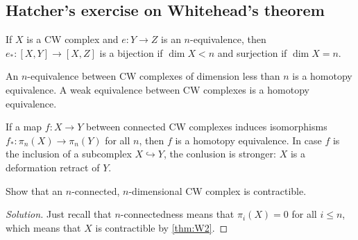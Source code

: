 \documentclass{article}
\numberwithin{equation}{section}
\begin{document}
\subsection{Hatcher's exercise on Whitehead's theorem}
\begin{thm}
	If $X$ is a CW complex and $e:Y\to Z$ is an $n$-equivalence, then $e_*:[X,Y]\to[X,Z]$ is a bijection if $\dim X<n$ and surjection if $\dim X=n$.
\end{thm}
\begin{thm}\label{thm:W2}
	An $n$-equivalence between CW complexes of dimension less than $n$ is a homotopy equivalence. A weak equivalence between CW complexes is a homotopy equivalence.
\end{thm}
\begin{thm}
	If a map $f:X\to Y$ between connected CW complexes induces isomorphisms $f_*:\pi_n(X)\to\pi_n(Y)$ for all $n$, then $f$ is a homotopy equivalence. In case $f$ is the inclusion of a subcomplex $X\hookrightarrow Y$, the conlusion is stronger: $X$ is a deformation retract of $Y$.
\end{thm}
\begin{exercise}[Hatcher 4.1.12]
	Show that an $n$-connected, $n$-dimensional CW complex is contractible.
\end{exercise}
\begin{proof}[Solution]
	Just recall that $n$-connectedness means that $\pi_i(X)=0$ for all $i\leq n$, which means that $X$ is contractible by \cref{thm:W2}.
\end{proof}
\end{document}
